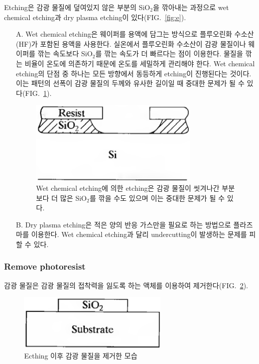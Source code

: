 \documentclass[aps,reprint,superscriptaddress,10pt]{revtex4-2}
\begin{document}
Etching은 감광 물질에 덮여있지 않은 부분의 SiO$_2$을 깎아내는 과정으로 wet chemical etching과  
dry plasma etching이 있다(FIG.~\ref{fig:e}).
\begin{itemize}
  \item[A. ] Wet chemical etching은 웨이퍼를 용액에 담그는 방식으로 플루오린화 수소산(HF)가 포함된
  용액을 사용한다. 실온에서 플루오린화 수소산이 감광 물질이나 웨이퍼를 깎는 속도보다 SiO$_2$를 깎는 속도가
  더 빠르다는 점이 이용한다. 물질을 깎는 비율이 온도에 의존하기 때문에 온도를 세밀하게 관리해야 한다.
  Wet chemical etching의 단점 중 하나는 모든 방향에서 동등하게 etching이 진행된다는 것이다.
  이는 패턴의 선폭이 감광 물질의 두께와 유사한 길이일 때 중대한 문제가 될 수 있다(FIG.~\ref{fig:wet}).

  \begin{figure}[htbp]
    \centering
  \includegraphics[scale=0.5]{wet.png}
    \caption{Wet chemical etching에 의한 etching은 감광 물질이 씻겨나간 부분보다 더 많은 SiO$_2$를
    깎을 수도 있으며 이는 중대한 문제가 될 수 있다.}
    \label{fig:wet}
  \end{figure}
  

  \item[B. ] Dry plasma etching은 적은 양의 반응 가스만을 필요로 하는 방법으로 플라즈마를 이용한다.
  Wet chemical etching과 달리 undercutting이 발생하는 문제를 피할 수 있다.
  
  
\end{itemize}

\subsubsection{Remove photoresist}
감광 물질은 감광 물질의 접착력을 잃도록 하는 액체를 이용하여 제거한다(FIG.~\ref{fig:f}).
\begin{figure}[htbp]
  \centering
  \includegraphics[scale=0.4]{f.png}
  \caption{Ecthing 이후 감광 물질을 제거한 모습}
    \label{fig:f}
  \end{figure}
\end{document}
